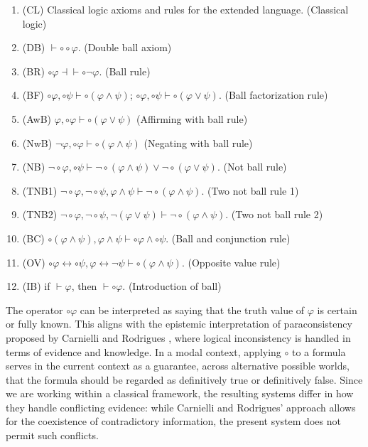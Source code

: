 \documentclass{amsart}
\renewcommand{\iff}{\longleftrightarrow}
\begin{document}
\begin{enumerate}
    \item\label{lc} (CL) Classical logic axioms and rules for the extended language. (Classical logic)
    \item\label{double-ball} (DB) $\vdash \circ \circ \varphi$. (Double ball axiom)
    \item\label{ball-rule} (BR) $\circ \varphi \dashv\vdash \circ \lnot \varphi$. (Ball rule)
    \item\label{ball-factorization} (BF) $\circ \varphi, \circ \psi \vdash \circ (\varphi \land \psi)$; $\circ \varphi, \circ \psi \vdash \circ (\varphi \lor \psi)$. (Ball factorization rule)
    \item\label{affirming-ball-rule} (AwB) $\varphi, \circ \varphi \vdash \circ (\varphi \lor \psi)$ (Affirming with ball rule)
    \item\label{negating-ball-rule} (NwB) $\lnot \varphi, \circ \varphi \vdash \circ (\varphi \land \psi)$  (Negating with ball rule)
    \item\label{not-ball-rule} (NB) $\lnot \circ \varphi, \circ \psi \vdash \lnot \circ(\varphi \land \psi) \lor \lnot \circ (\varphi \lor \psi)$. (Not ball rule)
    \item\label{two-not-ball-rule} (TNB1) $\lnot \circ \varphi, \lnot \circ \psi, \varphi \land \psi \vdash \lnot \circ(\varphi \land \psi)$. (Two not ball rule 1)
    \item (TNB2) $\lnot \circ \varphi, \lnot \circ \psi, \lnot (\varphi \lor \psi) \vdash \lnot \circ(\varphi \land \psi)$. (Two not ball rule 2)
    \item\label{ball-conjunction} (BC) $\circ (\varphi \land \psi), \varphi \land \psi \vdash \circ \varphi \land \circ \psi$. (Ball and conjunction rule)
    \item\label{opposite-value} (OV) $\circ \varphi \iff \circ \psi, \varphi \iff \lnot \psi \vdash \circ (\varphi \land \psi)$. (Opposite value rule)
    \item\label{intro-ball} (IB) if $\vdash \varphi$, then $\vdash \circ \varphi$. (Introduction of ball)
\end{enumerate}

The operator $\circ \varphi$ can be interpreted as saying that the truth value of $\varphi$ is certain or fully known. This aligns with the epistemic interpretation of paraconsistency proposed by Carnielli and Rodrigues \cite{carnielli_epistemic_2019, rodrigues_paraconsistency_2023}, where logical inconsistency is handled in terms of evidence and knowledge. In a modal context, applying $\circ$ to a formula serves in the current context as a guarantee, across alternative possible worlds, that the formula should be regarded as definitively true or definitively false. Since we are working within a classical framework, the resulting systems differ in how they handle conflicting evidence: while Carnielli and Rodrigues' approach allows for the coexistence of contradictory information, the present system does not permit such conflicts.
\end{document}
